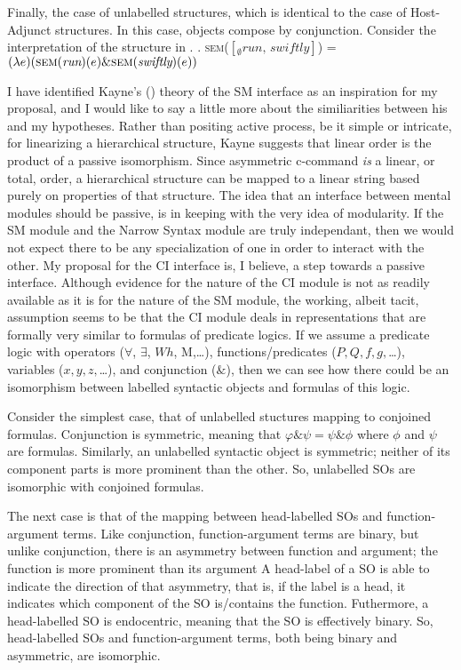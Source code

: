 \documentclass[MilwayThesis]{subfiles}
\begin{document}
Finally, the case of unlabelled structures, which is identical to the case of Host-Adjunct structures.
In this case, objects compose by conjunction.
Consider the interpretation of the structure in \Next.
\ex. \textsc{sem}($\left[_\emptyset \textit{run, swiftly} \right]$) =  $(\lambda e)(\textsc{sem}(\textit{run})(e) \& \textsc{sem}(\textit{swiftly})(e))$


I have identified Kayne's (\citeyear{kayne1994antisymmetry}) theory of the SM interface as an inspiration for my proposal, and I would like to say a little more about the similiarities between his and my hypotheses.
Rather than positing active process, be it simple or intricate, for linearizing a hierarchical structure, Kayne suggests that linear order is the product of a passive isomorphism.
Since asymmetric c-command \textit{is} a linear, or total, order, a hierarchical structure can be mapped to a linear string based purely on properties of that structure.
The idea that an interface between mental modules should be passive, is in keeping with the very idea of modularity.
If the SM module and the Narrow Syntax module are truly independant, then we would not expect there to be any specialization of one in order to interact with the other.
My proposal for the CI interface is, I believe, a step towards a passive interface.
Although evidence for the nature of the CI module is not as readily available as it is for the nature of the SM module, the working, albeit tacit, assumption seems to be that the CI module deals in representations that are formally very similar to formulas of predicate logics.
If we assume a predicate logic with operators ($\forall$, $\exists$, $Wh$, M,\ldots), functions/predicates ($P, Q, f, g,$\ldots), variables ($x, y, z,$\ldots), and conjunction ($\&$), then we can see how there could be an isomorphism between labelled syntactic objects and formulas of this logic.

Consider the simplest case, that of unlabelled stuctures mapping to conjoined formulas.
Conjunction is symmetric, meaning that $\varphi \& \psi = \psi \& \phi$ where $\phi$ and $\psi$ are formulas.
Similarly, an unlabelled syntactic object is symmetric; neither of its component parts is more prominent than the other.
So, unlabelled SOs are isomorphic with conjoined formulas.

The next case is that of the mapping between head-labelled SOs and function-argument terms.
Like conjunction, function-argument terms are binary, but unlike conjunction, there is an asymmetry between function and argument; the function is more prominent than its argument
A head-label of a SO is able to indicate the direction of that asymmetry, that is, if the label is a head, it indicates which component of the SO is/contains the function.
Futhermore, a head-labelled SO is endocentric, meaning that the SO is effectively binary.
So, head-labelled SOs and function-argument terms, both being binary and asymmetric, are isomorphic.
\end{document}
